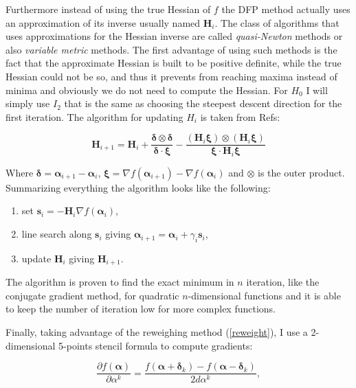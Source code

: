 Furthermore instead of using the true Hessian of $f$ the DFP method actually uses an approximation of its inverse usually named $\bm{H}_i$.
The class of algorithms that uses approximations for the Hessian inverse are called \textit{quasi-Newton} methods or also \textit{variable metric} methods.
The first advantage of using such methods is the fact that the approximate Hessian is built to be positive definite, while the true Hessian could not be so, and thus it prevents from reaching maxima instead of minima and obviously we do not need to compute the Hessian.
For $H_0$ I will simply use $I_2$ that is the same as choosing the steepest descent direction for the first iteration.
The algorithm for updating $H_i$ is taken from Refs\cite{larsevind,Fletcher2000,Griffin2012}:

\begin{equation}
  \bm{H}_{i+1}=\bm{H}_i + \dfrac{\bm{\delta}\otimes\bm{\delta}}{\bm{\delta}\cdot\bm{\xi}} - \dfrac{(\bm{H}_i\bm{\xi})\otimes(\bm{H}_i\bm{\xi})}{\bm{\xi}\cdot\bm{H}_i\bm{\xi}}
\end{equation}

Where $\bm{\delta}=\bm{\alpha}_{i+1}-\bm{\alpha}_i$, $\bm{\xi}=\nabla f(\bm{\alpha}_{i+1})-\nabla f(\bm{\alpha}_i)$ and $\otimes$ is the outer product.
Summarizing everything the algorithm looks like the following\cite{Fletcher2000,Griffin2012}:

\begin{enumerate}
  \item set $\bm{s}_i=-\bm{H}_i\nabla f(\bm{\alpha}_i)$,
  \item line search along $\bm{s}_i$ giving $\bm{\alpha}_{i+1}=\bm{\alpha}_i + \gamma_i\bm{s}_i$,
  \item update $\bm{H}_i$ giving $\bm{H}_{i+1}$.
\end{enumerate}

The algorithm is proven to find the exact minimum in $n$ iteration, like the conjugate gradient method, for quadratic $n$-dimensional functions and it is able to keep the number of iteration low for more complex functions.

Finally, taking advantage of the reweighing method (\autoref{reweight}), I use a  2-dimensional 5-points stencil formula to compute gradients:

\begin{equation}
  \dfrac{\partial f(\bm{\alpha})}{\partial \alpha^k}=\dfrac{f(\bm{\alpha}+\bm{\delta}_k)-f(\bm{\alpha}-\bm{ \delta}_k)}{2d\alpha^k},
\end{equation}

